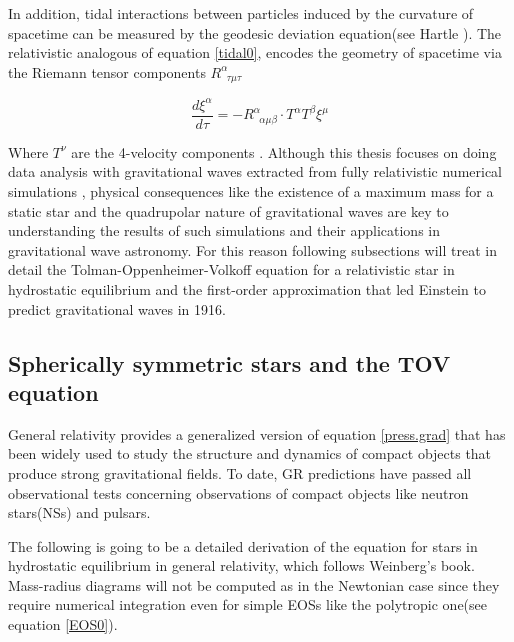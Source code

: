 In addition, tidal interactions between particles induced by the curvature of spacetime can be measured by the geodesic deviation equation(see Hartle \cite{Hartle:2021pel}). The relativistic analogous of equation \ref{tidal0}, encodes the geometry of spacetime via the Riemann tensor components $R^{\alpha}_{\;\; \tau \mu \tau}$

\begin{equation}\label{tidal1}
\frac{d \xi^{\alpha}}{d\tau} = - R^{\alpha}_{\;\; \alpha \mu \beta} \cdot T^{\alpha} T^{\beta} \xi^{\mu}
\end{equation} 

Where $T^{\nu}$ are the 4-velocity components . Although this thesis focuses on doing data analysis with gravitational waves extracted from fully relativistic numerical simulations \cite{Bishop:2016lgv}, physical consequences like the existence of a maximum mass for a static star and the quadrupolar nature of gravitational waves are key to understanding the results of such simulations and their applications in gravitational wave astronomy. For this reason following subsections will treat in detail the Tolman-Oppenheimer-Volkoff equation for a relativistic star in hydrostatic equilibrium and the first-order approximation that led Einstein to predict gravitational waves in 1916.





\subsection{Spherically symmetric stars and the TOV equation}\label{codeon}

General relativity provides a generalized version of equation  \ref{press.grad} that has been widely used to study the structure and dynamics of compact objects that produce strong gravitational fields. To date, GR predictions have passed all observational tests concerning observations of compact objects like neutron stars(NSs) and pulsars. 



The following is going to be a detailed derivation of the equation for stars in hydrostatic equilibrium in general relativity, which follows Weinberg's book\cite{Weinberg:1972kfs}. Mass-radius diagrams will not be computed as in the Newtonian case since they require numerical integration even for simple EOSs like the polytropic one(see equation \ref{EOS0}). 

